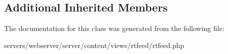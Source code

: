 \subsection*{Additional Inherited Members}


The documentation for this class was generated from the following file\+:\begin{DoxyCompactItemize}
\item 
servers/webserver/server/content/views/rtfeed/rtfeed.\+php\end{DoxyCompactItemize}
